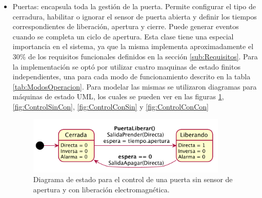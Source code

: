 \begin{itemize}
	\item Puertas: encapsula toda la gestión de la puerta. Permite configurar el tipo de cerradura, habilitar o ignorar el sensor de puerta abierta y definir los tiempos correspondientes de liberación, apertura y cierre. Puede generar eventos cuando se completa un ciclo de apertura. Esta clase tiene una especial importancia en el sistema, ya que la misma implementa aproximadamente el 30\% de los requisitos funcionales definidos en la sección \ref{sub:Requisitos}. Para la implementación se optó por utilizar cuatro maquinas de estado finitos independientes, una para cada modo de funcionamiento descrito en la tabla \ref{tab:ModosOperacion}. Para modelar las mismas se utilizaron diagramas para máquinas de estado UML\cite{noauthor_lenguaje_2020}\cite{noauthor_uml_2012}, los cuales se pueden ver en las figuras \ref{fig:ControlSinSin}, \ref{fig:ControlSinCon}, \ref{fig:ControlConSin} y \ref{fig:ControlConCon}

\begin{figure}[H]
	\centering
	\includegraphics[width=0.9\textwidth]{Figures/PNK-DE001.pdf}
	\caption[Diagrama de estados con cerradura electromagnética y sin sensor]{Diagrama de estado para el control de una puerta sin sensor de apertura y con liberación electromagnética.}
	\label{fig:ControlSinSin}
\end{figure}


\end{itemize}
